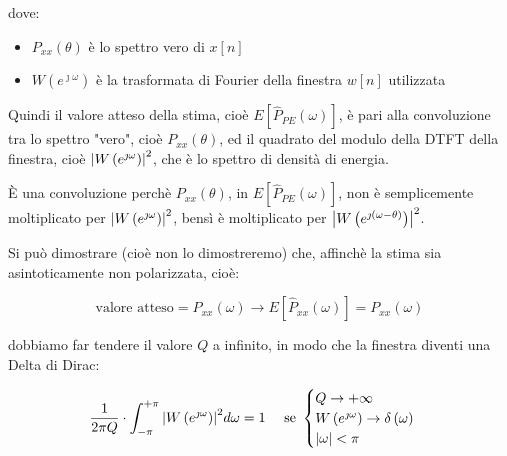 dove: 

\begin{itemize}
    \item $P_{xx} \left(\theta\right)$ è lo spettro vero di $x \left[ n\right]$ 
    \item $W \left(e^{\jmath \omega} \right)$ è la trasformata di Fourier della finestra $w \left[ n\right]$ utilizzata 
\end{itemize}

Quindi il valore atteso della stima, cioè $E \left[ \hat{P}_{PE} \left(\omega\right)\right]$, 
è pari alla convoluzione tra lo spettro "vero", cioè $P_{xx} \left(\theta\right)$,  ed il quadrato del modulo della DTFT della finestra, cioè $\abs{W \left(e^{\jmath \omega }\right)}^{2}$, che è lo spettro di densità di energia. \newline 

È una convoluzione perchè $P_{xx} \left(\theta\right)$, in $E \left[ \hat{P}_{PE} \left(\omega\right)\right]$, non è semplicemente moltiplicato per $\abs{W \left(e^{\jmath \omega }\right)}^{2}$, 
bensì è moltiplicato per $\abs{W \left(e^{\jmath \left(\omega - \theta\right)}\right)}^{2}$. \newline 

Si può dimostrare (cioè non lo dimostreremo) che, affinchè la stima sia asintoticamente non polarizzata, cioè:

 {
        \Large 
        \begin{equation}
            \text{valore atteso} 
            = 
            P_{xx} \left(\omega\right)
            \to 
            E \left[ \hat{P}_{xx} \left(\omega\right)\right] 
            = 
            P_{xx} \left(\omega\right)
        \end{equation}
} 

dobbiamo far tendere il valore $Q$ a infinito, in modo che la finestra diventi una Delta di Dirac: 

{
    \Large 
    \begin{equation}
        \dfrac{1}{2 \pi Q}
        \cdot 
        \int_{- \pi}^{+ \pi} 
        \abs{W \left(e^{\jmath \omega}\right)}^{2} 
        d \omega 
        = 
        1
        \quad
        \text{ se } 
        \begin{cases}
            Q \to + \infty 
            \\ 
            W \left(e^{\jmath \omega}\right) \to \delta \left(\omega\right) 
            \\
            \abs{\omega} < \pi
        \end{cases}
    \end{equation}
}

